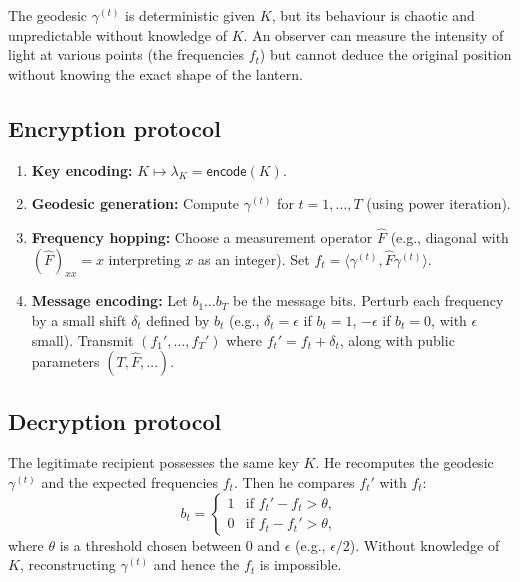 \documentclass[11pt,a4paper]{article}
\begin{document}
The geodesic \(\gamma^{(t)}\) is deterministic given \(K\), but its behaviour is chaotic and unpredictable without knowledge of \(K\). An observer can measure the intensity of light at various points (the frequencies \(f_t\)) but cannot deduce the original position without knowing the exact shape of the lantern.

\subsection{Encryption protocol}
\begin{enumerate}
\item \textbf{Key encoding:} \(K \mapsto \lambda_K = \mathsf{encode}(K)\).
\item \textbf{Geodesic generation:} Compute \(\gamma^{(t)}\) for \(t = 1,\ldots,T\) (using power iteration).
\item \textbf{Frequency hopping:} Choose a measurement operator \(\hat{F}\) (e.g., diagonal with \((\hat{F})_{xx} = x\) interpreting \(x\) as an integer). Set \(f_t = \langle \gamma^{(t)}, \hat{F} \gamma^{(t)} \rangle\).
\item \textbf{Message encoding:} Let \(b_1\ldots b_T\) be the message bits. Perturb each frequency by a small shift \(\delta_t\) defined by \(b_t\) (e.g., \(\delta_t = \epsilon\) if \(b_t = 1\), \(-\epsilon\) if \(b_t = 0\), with \(\epsilon\) small). Transmit \((f_1',\ldots,f_T')\) where \(f_t' = f_t + \delta_t\), along with public parameters \((T,\hat{F},\ldots)\).
\end{enumerate}

\subsection{Decryption protocol}
The legitimate recipient possesses the same key \(K\). He recomputes the geodesic \(\gamma^{(t)}\) and the expected frequencies \(f_t\). Then he compares \(f_t'\) with \(f_t\):
\[
b_t = \begin{cases}
1 & \text{if } f_t' - f_t > \theta,\\
0 & \text{if } f_t - f_t' > \theta,
\end{cases}
\]
where \(\theta\) is a threshold chosen between \(0\) and \(\epsilon\) (e.g., \(\epsilon/2\)). Without knowledge of \(K\), reconstructing \(\gamma^{(t)}\) and hence the \(f_t\) is impossible.
\end{document}
